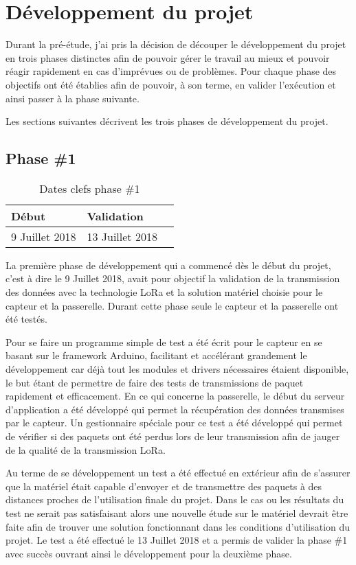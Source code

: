 
\chapter{Développement du projet}\label{ch:developpement}

Durant la pré-étude, j'ai pris la décision de découper le développement du projet en trois phases distinctes afin de pouvoir gérer le travail au mieux et pouvoir réagir rapidement en cas d'imprévues ou de problèmes. Pour chaque phase des objectifs ont été établies afin de pouvoir, à son terme, en valider l'exécution et ainsi passer à la phase suivante.

Les sections suivantes décrivent les trois phases de développement du projet.

\section{Phase \#1}

\begin{table}[htb]
\caption{Dates clefs phase \#1}
\label{tab:detail_phase_1}
\centering
\begin{tabular}{ l l l }
\toprule
Début & Validation \\
\midrule
9 Juillet 2018 & 13 Juillet 2018  \\
\bottomrule 
\end{tabular}
\end{table}

La première phase de développement qui a commencé dès le début du projet, c'est à dire le 9 Juillet 2018, avait pour objectif la validation de la transmission des données avec la technologie LoRa et la solution matériel choisie pour le capteur et la passerelle. Durant cette phase seule le capteur et la passerelle ont été testés.

Pour se faire un programme simple de test a été écrit pour le capteur en se basant sur le framework Arduino, facilitant et accélérant grandement le développement car déjà tout les modules et drivers nécessaires étaient disponible, le but étant de permettre de faire des tests de transmissions de paquet rapidement et efficacement. En ce qui concerne la passerelle, le début du serveur d'application a été développé qui permet la récupération des données transmises par le capteur. Un gestionnaire spéciale pour ce test a été développé qui permet de vérifier si des paquets ont été perdus lors de leur transmission afin de jauger de la qualité de la transmission LoRa.

Au terme de se développement un test a été effectué en extérieur afin de s'assurer que la matériel était capable d'envoyer et de transmettre des paquets à des distances proches de l'utilisation finale du projet. Dans le cas ou les résultats du test ne serait pas satisfaisant alors une nouvelle étude sur le matériel devrait être faite afin de trouver une solution fonctionnant dans les conditions d'utilisation du projet. Le test a été effectué le 13 Juillet 2018 et a permis de valider la phase \#1 avec succès ouvrant ainsi le développement pour la deuxième phase.

